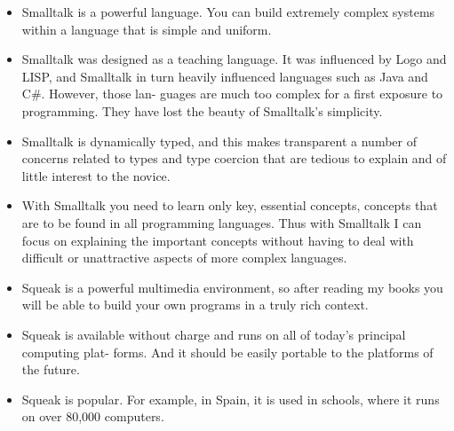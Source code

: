 \documentclass[a4paper,10pt,twoside]{book}
\begin{document}
\begin{itemize}
\item  Smalltalk is a powerful language. You can build extremely complex systems within a 
language that is simple and uniform. 
\item  Smalltalk was designed as a teaching language. It was influenced by Logo and LISP, and 
Smalltalk in turn heavily influenced languages such as Java and C\#. However, those lan- 
guages are much too complex for a first exposure to programming. They have lost the 
beauty of Smalltalk’s simplicity. 
\item  Smalltalk is dynamically typed, and this makes transparent a number of concerns 
related to types and type coercion that are tedious to explain and of little interest to 
the novice. 
\item  With Smalltalk you need to learn only key, essential concepts, concepts that are to be 
found in all programming languages. Thus with Smalltalk I can focus on explaining the 
important concepts without having to deal with difficult or unattractive aspects of 
more complex languages. 
\item  Squeak is a powerful multimedia environment, so after reading my books you will be 
able to build your own programs in a truly rich context. 
\item  Squeak is available without charge and runs on all of today’s principal computing plat- 
forms. And it should be easily portable to the platforms of the future. 
\item  Squeak is popular. For example, in Spain, it is used in schools, where it runs on over 
80,000 computers.
\end{itemize}

\ifx\wholebook\relax\else
    
\end{document}
